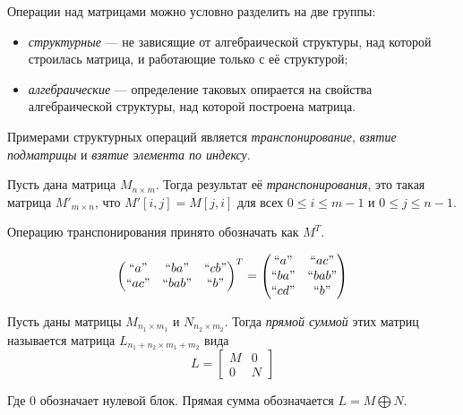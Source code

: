 Операции над матрицами можно условно разделить на две группы:
\begin{itemize}
	\item \textit{структурные} --- не зависящие от алгебраической структуры, над которой строилась матрица, и работающие только с её структурой;
	\item \textit{алгебраические} --- определение таковых опирается на свойства алгебраической структуры, над которой построена матрица.
\end{itemize}

Примерами структурных операций является \textit{транспонирование}, \textit{взятие подматрицы} и \textit{взятие элемента по индексу}.

\begin{definition}
	Пусть дана матрица $M_{n\times m}$. Тогда результат её \emph{транспонирования}, это такая матрица $M'_{m\times n}$, что $M'[i,j] = M[j,i]$ для всех $0\leq i \leq m - 1$ и $0\leq j \leq n - 1$.

	Операцию транспонирования принято обозначать как $M^{T}$.

\end{definition}

\begin{example}
	$$
		\begin{pmatrix}
			``a"  & ``ba"  & ``cb" \\
			``ac" & ``bab" & ``b"  \\
		\end{pmatrix}^T =
		\begin{pmatrix}
			``a"  & ``ac"  \\
			``ba" & ``bab" \\
			``cd" & ``b"   \\
		\end{pmatrix}
	$$
\end{example}


\begin{definition}
	Пусть даны матрицы $M_{n_1\times m_1}$ и $N_{n_2\times m_2}$. Тогда \emph{прямой суммой} этих матриц называется матрица $L_{n_1+n_2 \times m_1+m_2}$ вида
	$$
		L =
		\left[
			\begin{matrix}
				M & 0 \\
				0 & N
			\end{matrix}
			\right]
	$$

	Где 0 обозначает нулевой блок. Прямая сумма обозначается $L = M \bigoplus N$.

\end{definition}


